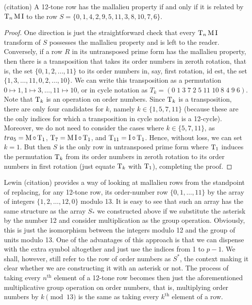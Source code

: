 \begin{proposition}
	\label{mallalieu-Morris}
	(citation)
	A 12-tone row has the mallalieu property if and only if it is related by $\operatorname{T}_n\operatorname{M}\operatorname{I}$
	to the row $S = \{ 0, 1, 4, 2, 9, 5, 11, 3, 8, 10, 7, 6 \}$.
	\begin{proof}
		One direction is just the straightforward check that every $\operatorname{T}_n\operatorname{M}\operatorname{I}$ transform of
		$S$ possesses the mallalieu property and is left to the reader. Conversely, if a
		row $R$ in its untransposed prime form has the mallalieu property, then there is
		a transposition that takes its order numbers in zeroth rotation, that is, the set
		$\{ 0, 1, 2, \dots, 11 \}$ to its order numbers in, say, first rotation, id est,
		the set $\{ 1, 3, \dots, 11, 0, 2, \dots, 10 \}$. We can write this transposition
		as a permutation $0 \mapsto 1, 1 \mapsto 3, \dots, 11 \mapsto 10 $, or in cycle
		notation as $T_k = ( 0 \; 1 \; 3 \; 7 \; 2 \; 5 \; 11 \; 10 \; 8 \; 4 \; 9 \; 6 )$.
		Note that $\operatorname{T}_k$ is an operation on order numbers. Since $\operatorname{T}_k$ is a transposition,
		there are only four candidates for $k$, namely $k \in \{ 1, 5, 7, 11 \}$
		(because these are the only indices for which a transposition in cycle notation is
		a 12-cycle). Moreover, we do not need to consider the cases where
		$k \in \{5, 7, 11\}$, as $tra_5 = \operatorname{M} \circ \operatorname{T}_1$, $\operatorname{T}_7 = \operatorname{M}\operatorname{I} \circ \operatorname{T}_1$,
		and $\operatorname{T}_{11} = \operatorname{I} \circ \operatorname{T}_1$. Hence, without loss, we can set $k = 1$. But then
		$S$ is the only row in untransposed prime form where $\operatorname{T}_1$ induces the permutation
		$\operatorname{T}_k$ from its order numbers in zeroth rotation to its order numbers in first
		rotation (just equate $\operatorname{T}_k$ with $\operatorname{T}_1$), completing the proof.
	\end{proof}
\end{proposition}

Lewin (citation) provides a way of looking at mallalieu rows from the standpoint of
replacing, for any 12-tone row, its order-number row $\{ 0, 1, \dots, 11 \}$ by the array
of integers $\{ 1, 2, \dots, 12, 0 \}$ modulo 13. It is easy to see that such an array has
the same structure as the array $S_*$ we constructed above if we substitute the asterisk
by the number 12 and consider multiplication as the group operation. Obviously, this is
just the isomorphism between the integers modulo 12 and the group of units modulo 13.
One of the advantages of this approach is that we can dispense with the extra symbol
altogether and just use the indices from 1 to $p - 1$. We shall, however, still refer to
the row of order numbers as $S^*$, the context making it clear whether we are constructing
it with an asterisk or not. The process of taking every $n^\text{th}$ element of a 12-tone
row becomes then just the aforementioned multiplicative group operation on order numbers,
that is, multiplying order numbers by $k \pmod{13}$ is the same as taking every
$k^\text{th}$ element of a row.


